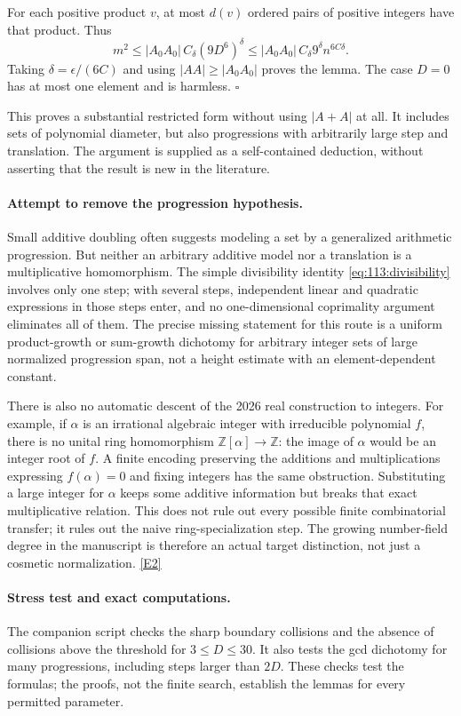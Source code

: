 \documentclass[11pt,a4paper]{article}
\newcommand{\Z}{\mathbb{Z}}
\newcommand{\eref}[2]{\hyperlink{extra:#1:#2}{[E#2]}}
\numberwithin{equation}{section}
\begin{document}
For each positive product $v$, at most $d(v)$ ordered pairs of positive
integers have that product. Thus
\[
 m^2\leq |A_0A_0|\,C_\delta(9D^6)^\delta
 \leq |A_0A_0|\,C_\delta9^\delta n^{6C\delta}.
\]
Taking $\delta=\epsilon/(6C)$ and using $|AA|\geq|A_0A_0|$ proves the
lemma. The case $D=0$ has at most one element and is harmless. $\square$

This proves a substantial restricted form without using $|A+A|$ at all.
It includes sets of polynomial diameter, but also progressions with
arbitrarily large step and translation. The argument is supplied as a
self-contained deduction, without asserting that the result is new in
the literature.

\paragraph{Attempt to remove the progression hypothesis.}
Small additive doubling often suggests modeling a set by a generalized
arithmetic progression. But neither an arbitrary additive model nor a
translation is a multiplicative homomorphism. The simple divisibility
identity \eqref{eq:113:divisibility} involves only one step; with several
steps, independent linear and quadratic expressions in those steps enter,
and no one-dimensional coprimality argument eliminates all of them.
The precise missing statement for this route is a uniform product-growth
or sum-growth dichotomy for arbitrary integer sets of large normalized
progression span, not a height estimate with an element-dependent constant.

There is also no automatic descent of the 2026 real construction to
integers. For example, if $\alpha$ is an irrational algebraic integer with
irreducible polynomial $f$, there is no unital ring homomorphism
$\Z[\alpha]\to\Z$: the image of $\alpha$ would be an integer root of $f$.
A finite encoding preserving the additions and multiplications expressing
$f(\alpha)=0$ and fixing integers has the same obstruction. Substituting
a large integer for $\alpha$ keeps some additive information but breaks
that exact multiplicative relation. This does not rule out every possible
finite combinatorial transfer; it rules out the naive ring-specialization
step. The growing number-field degree in the manuscript is therefore an
actual target distinction, not just a cosmetic normalization.
\eref{113}{2}

\paragraph{Stress test and exact computations.}
The companion script checks the sharp boundary collisions and the absence
of collisions above the threshold for $3\leq D\leq30$. It also tests the
gcd dichotomy for many progressions, including steps larger than $2D$.
These checks test the formulas; the proofs, not the finite search, establish
the lemmas for every permitted parameter.
\end{document}
